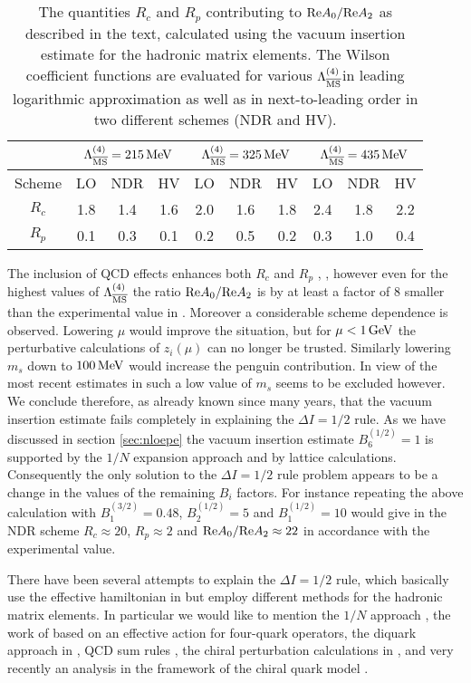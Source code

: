 \begin{table}[htb]
\caption[]{The quantities $R_c$ and $R_p$ contributing to ${\rm
Re}A_0/{\rm Re}A_2$ as described in the text, calculated using the
vacuum  insertion estimate for the hadronic matrix elements. The Wilson
coefficient functions are evaluated for various $\Lambda_{\overline{\rm MS}}^{(4)}$in leading
logarithmic approximation as well as in next-to-leading order in two
different schemes (NDR and HV).
\label{tab:rcrp}}
\begin{center}
\begin{tabular}{|c|c|c|c|c|c|c|c|c|c|}
&\multicolumn{3}{c|}{$\Lambda_{\overline{\rm MS}}^{(4)}=215\, {\rm MeV}$}
&\multicolumn{3}{c|}{$\Lambda_{\overline{\rm MS}}^{(4)}=325\, {\rm MeV}$}
&\multicolumn{3}{c|}{$\Lambda_{\overline{\rm MS}}^{(4)}=435\, {\rm MeV}$}\\
 \hline
Scheme&LO&NDR&HV&LO&NDR&HV&LO&NDR&HV\\ \hline
$R_c$&1.8&1.4&1.6&2.0&1.6&1.8&2.4&1.8&2.2\\
 \hline
$R_p$&0.1&0.3&0.1&0.2&0.5&0.2&0.3&1.0&0.4
\end{tabular}
\end{center}
\end{table}

The inclusion of QCD effects enhances both $R_c$ and $R_p$
\cite{gaillard:74}, \cite{altarelli:74}, however even for the highest
values of $\Lambda_{\overline{\rm MS}}^{(4)}$ the ratio ${\rm Re}A_0/{\rm Re}A_2$ is by at
least a factor of 8 smaller than the experimental value in
. Moreover a considerable scheme dependence is observed.
Lowering $\mu$ would improve the situation, but for $\mu< 1\, {\rm GeV}$ the
perturbative calculations of $z_i(\mu)$ can no longer be trusted.
Similarly lowering $m_s$ down to $100\, {\rm MeV}$ would increase the penguin
contribution. In view of the most recent estimates in 
such a low value of $m_s$ seems to be excluded however. We conclude
therefore, as already known since many years, that the vacuum insertion
estimate fails completely in explaining the $\Delta I=1/2$ rule. As we
have discussed in section \ref{sec:nloepe} the vacuum insertion
estimate $B^{(1/2)}_6=1$ is supported by the $1/N$ expansion approach
and by lattice calculations. Consequently the only solution to the
$\Delta I=1/2$ rule problem appears to be a change in the values of the
remaining $B_i$ factors. For instance repeating the above calculation
with $B^{(3/2)}_1=0.48$, $B^{(1/2)}_2=5$ and  $B^{(1/2)}_1=10$ would
give in the NDR scheme $R_c\approx 20$, $R_p\approx 2$ and ${\rm
Re}A_0/{\rm Re}A_2\approx 22$ in accordance with the experimental
value.

There have been several attempts to explain the $\Delta I=1/2$ rule,
which basically use the effective hamiltonian in
 but employ different methods for the hadronic
matrix elements.  In particular we would like to mention the $1/N$
approach \cite{bardeen:87b}, the work of \cite{pichderafael:91} based
on an effective action for four-quark operators, the diquark
approach in \cite{neubertstech:91}, QCD sum rules \cite{jaminpich:94},
the chiral perturbation calculations in \cite{kamboretal:90},
\cite{kamboretal:91} and very recently an analysis \cite{antonellietal:95}
 in the framework of the chiral quark model \cite{cohenmanohar:84}.

